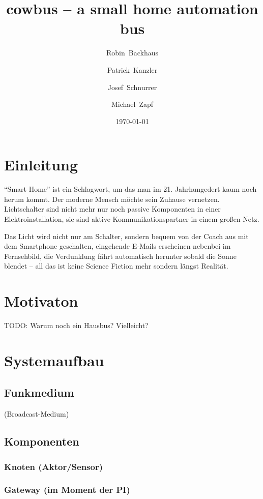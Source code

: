 \documentclass{IEEEtran}
\begin{document}
\title{cowbus -- a small home automation bus}
\author{Robin~Backhaus \and Patrick~Kanzler \and Josef~Schnurrer \and Michael~Zapf}
\date{\today}



\maketitle

\begin{abstract}
\end{abstract}


\section{Einleitung}
\enquote{Smart Home} ist ein Schlagwort, um das man im 21. Jahrhungedert
kaum noch herum kommt. Der moderne Mensch möchte sein Zuhause vernetzen.
Lichtschalter sind nicht mehr nur noch passive Komponenten in einer
Elektroinstallation, sie sind aktive Kommunikationspartner in einem großen Netz.

Das Licht wird nicht nur am Schalter, sondern bequem von der Coach aus mit dem
Smartphone geschalten, eingehende E-Mails erscheinen nebenbei im Fernsehbild,
die Verdunklung fährt automatisch herunter sobald die Sonne blendet --
all das ist keine Science Fiction mehr sondern längst Realität.

\section{Motivaton}
TODO: Warum noch ein Hausbus? Vielleicht?

\section{Systemaufbau}
    \subsection{Funkmedium}
        (Broadcast-Medium)

    \subsection{Komponenten}
        \subsubsection{Knoten (Aktor/Sensor)}
        \subsubsection{Gateway (im Moment der PI)}
\end{document}
